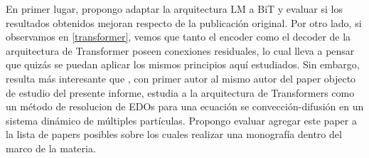 \documentclass[titlepage,a4paper,oneside]{article}
\begin{document}
En primer lugar, propongo adaptar la arquitectura LM a BiT y evaluar si los resultados obtenidos mejoran respecto de la publicación original. Por otro lado, si observamos en \ref{transformer}, vemos que tanto el encoder como el decoder de la arquitectura de Transformer poseen conexiones residuales, lo cual lleva a pensar que quizás se puedan aplicar los mismos principios aquí estudiados. Sin embargo, resulta más interesante que \cite{lu2019understanding}, con primer autor al mismo autor del paper objecto de estudio del presente informe, estudia a la arquitectura de Transformers como un método de resolucion de EDOs para una ecuación se convección-difusión en un sistema dinámico de múltiples partículas. Propongo evaluar agregar este paper a la lista de papers posibles sobre los cuales realizar una monografía dentro del marco de la materia.

\newpage

\printbibliography
\end{document}
